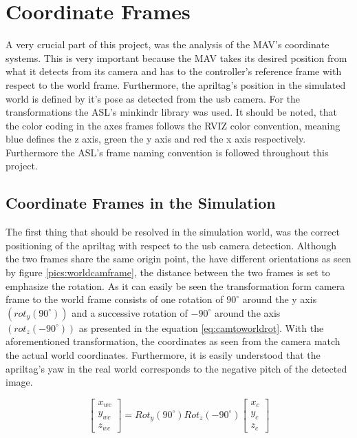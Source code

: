 \chapter{Coordinate Frames}
\label{sec:CoordianteFrames}

A very crucial part of this project, was the analysis of the MAV's coordinate systems. This is very important because the MAV takes its desired position from what it detects from its camera and has to the controller's reference frame with respect to the world frame. Furthermore, the apriltag's position in the simulated world is defined by it's pose as detected from the usb camera. For the transformations the ASL's minkindr library was used. It should be noted, that the color coding in the axes frames follows the RVIZ color convention, meaning blue defines the z axis, green the y axis and red the x axis respectively. Furthermore the ASL's frame naming convention \cite{FrameNamingConvention} is followed throughout this project. 

 \section{Coordinate Frames in the Simulation }
 \label{sec: CoordinatesinSimulation}
 
 The first thing that should be resolved in the simulation world, was the correct positioning of the apriltag with respect to the usb camera detection. Although the two frames share the same origin point, the have different orientations as seen by figure \ref{pics:worldcamframe}, the distance between the two frames is set to emphasize the rotation. As it can easily be seen the transformation form camera frame to the world frame consists of one rotation of $90^{\circ}$ around the y axis $(rot_{y}(90^{\circ}))$ and a successive rotation of $-90^{\circ}$ around the axis $(rot_z(-90^{\circ}))$ as presented in the equation \ref{eq:camtoworldrot}. With the aforementioned transformation, the coordinates as seen from the camera match the actual world coordinates. Furthermore, it is easily understood that the apriltag's yaw in the real world corresponds to the negative pitch of the detected image.
 
  \begin{equation}
  \label{eq:camtoworldrot}
  \left[\begin{array}{c}
  x_{wc} \\ y_{wc} \\ z_{wc}  \end{array} \right] = Rot_{y}(90^{\circ})Rot_z(-90^{\circ})\left[ \begin{array}{c} x_c \\ y_c \\z_c \end{array} \right]
  \end{equation}
 
